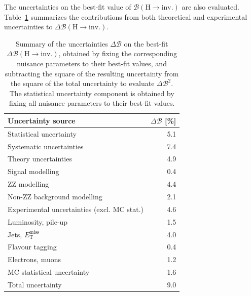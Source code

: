The uncertainties on the best-fit value of 
$\mathcal{B}(\text{H} \to \text{inv.})$ are also evaluated. 
Table~\ref{tab:branching-Hins-syst} summarizes the contributions from both theoretical and experimental uncertainties to 
$\Delta\mathcal{B}(\text{H} \to \text{inv.})$.
\begin{table}[!htbp]
\centering
\begin{tabular}{l r}
\hline\hline
Uncertainty source & $\Delta\mathcal{B}$ [\%] \\
\hline

Statistical uncertainty & 5.1 \\

Systematic uncertainties & 7.4 \\
\quad Theory uncertainties & 4.9 \\
\quad\quad Signal modelling & 0.4 \\
\quad\quad $\text{ZZ}$ modelling & 4.4 \\
\quad\quad Non-$\text{ZZ}$ background modelling & 2.1 \\

\quad Experimental uncertainties (excl. MC stat.) & 4.6 \\
\quad\quad Luminosity, pile-up & 1.5 \\
\quad\quad Jets, $E_{\text{T}}^{\text{miss}}$ & 4.0 \\
\quad\quad Flavour tagging & 0.4 \\
\quad\quad Electrons, muons & 1.2 \\

\quad MC statistical uncertainty & 1.6 \\

\hline
Total uncertainty & 9.0 \\
\hline\hline
 
\end{tabular}
\caption{Summary of the uncertainties $\Delta\mathcal{B}$ on the best-fit $\Delta\mathcal{B} (\text{H} \to \text{inv.})$, obtained by fixing the corresponding nuisance parameters to their best-fit values, and subtracting the square of the resulting uncertainty from the square of the total uncertainty to evaluate $\Delta\mathcal{B}^2$. The statistical uncertainty component is obtained by fixing all nuisance parameters to their best-fit values. 
}
\label{tab:branching-Hins-syst}
\end{table}

